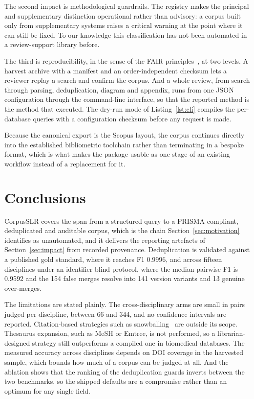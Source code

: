 \documentclass[final,5p,times,twocolumn]{elsarticle}
\begin{document}
The second impact is methodological guardrails. The registry makes the
principal and supplementary distinction operational rather than advisory: a
corpus built only from supplementary systems raises a critical warning at the
point where it can still be fixed. To our knowledge this classification has
not been automated in a review-support library before.

The third is reproducibility, in the sense of the FAIR
principles~\cite{wilkinson2016}, at two levels. A harvest archive with a manifest
and an order-independent checksum lets a reviewer replay a search and confirm
the corpus. And a whole review, from search through parsing, deduplication,
diagram and appendix, runs from one JSON configuration through the
command-line interface, so that the reported method is the method that
executed. The dry-run mode of Listing~\ref{lst:cli} compiles the per-database
queries with a configuration checksum before any request is made.

Because the canonical export is the Scopus layout, the corpus continues
directly into the established bibliometric toolchain rather than terminating
in a bespoke format, which is what makes the package usable as one stage of an
existing workflow instead of a replacement for it.

\section{Conclusions}
\label{sec:conclusions}

CorpusSLR covers the span from a structured query to a PRISMA-compliant,
deduplicated and auditable corpus, which is the chain
Section~\ref{sec:motivation} identifies as unautomated, and it delivers the
reporting artefacts of Section~\ref{sec:impact} from recorded provenance.
Deduplication is validated against a
published gold standard, where it reaches F1 0.9996, and across fifteen
disciplines under an identifier-blind protocol, where the median pairwise F1
is 0.9592 and the 154 false merges resolve into 141 version variants and 13
genuine over-merges.

The limitations are stated plainly. The cross-disciplinary arms are small in
pairs judged per discipline, between 66 and 344, and no confidence intervals
are reported. Citation-based strategies such as snowballing~\cite{wohlin2014} are outside
its scope. Thesaurus expansion, such as MeSH or Emtree, is not performed,
so a librarian-designed strategy still outperforms a compiled one in
biomedical databases. The measured accuracy across disciplines depends on DOI
coverage in the harvested sample, which bounds how much of a corpus can be
judged at all. And the ablation shows that the ranking of the deduplication
guards inverts between the two benchmarks, so the shipped defaults are a
compromise rather than an optimum for any single field.
\end{document}
